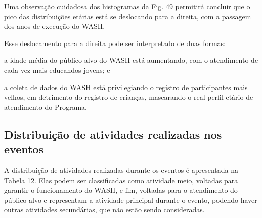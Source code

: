 \documentclass[
12pt,		%
openright,	%
twoside,  %
a4paper,			%
chapter=TITLE,		%
english,			%
french,				%
spanish,			%
brazil				%
]{USPSC-classe/USPSC}
\begin{document}
Uma observa\c{c}\~ao cuidadosa dos histogramas da Fig. 49 permitir\'a concluir que o pico das distribui\c{c}\~oes et\'arias est\'a se deslocando para a direita, com a passagem dos anos de execu\c{c}\~ao do WASH.









Esse deslocamento para a direita pode ser interpretado de duas formas:










\begin{alineas}
\item a idade m\'edia do p\'ublico alvo do WASH est\'a aumentando, com o atendimento de cada vez mais educandos jovens; e
\item a coleta de dados do WASH est\'a privilegiando o registro de participantes mais velhos, em detrimento do registro de crian\c{c}as, mascarando o real perfil et\'ario de atendimento do Programa.
\end{alineas}

\subsection[Distribui\c{c}\~ao de atividades realizadas nos eventos]{Distribui\c{c}\~ao de atividades realizadas nos eventos}\label{Distribui\c{c}\~ao de atividades realizadas nos eventos}
A distribui\c{c}\~ao de atividades realizadas durante os eventos \'e apresentada na Tabela 12. Elas podem ser classificadas como \textquotedbl atividade meio\textquotedbl , voltadas para garantir o funcionamento do WASH, e \textquotedbl fim\textquotedbl , voltadas para o atendimento do p\'ublico alvo e representam a atividade principal durante o evento, podendo haver outras atividades secund\'arias, que n\~ao est\~ao sendo consideradas.
\end{document}
